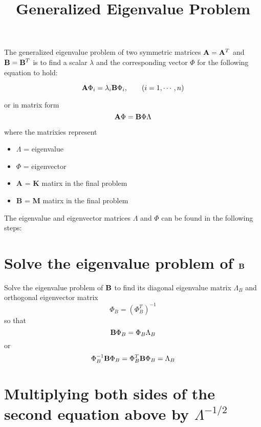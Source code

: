 \documentclass[11pt,letterpaper]{article}
\title{Generalized Eigenvalue Problem}
\date{}
\begin{document}
\maketitle



The generalized eigenvalue problem of two symmetric matrices  ${\bf A}={\bf A}^T$ and ${\bf B}={\bf B}^T$ is to find a scalar $\lambda$ and the corresponding vector $\Phi$ for the following equation to hold: 

\begin{equation}
{\bf A}\Phi_i=\lambda_i{\bf B}\Phi_i, \;\;\;\;\;\;\;(i=1,\cdots,n)
\end{equation}

\noindent or in matrix form 
\begin{equation}
{\bf A}\Phi={\bf B}\Phi\Lambda
\end{equation}

\noindent where the matrixies represent

\begin{itemize}
\item $\Lambda$ = eigenvalue
\item $\Phi$ = eigenvector
\item \textbf{A} = \textbf{K} matirx in the final problem
\item \textbf{B} = \textbf{M} matirx in the final problem
\end{itemize}

 The eigenvalue and eigenvector matrices $\Lambda$ and $\Phi$ can be found in the following steps:

\section{Solve the eigenvalue problem of ${\bf B}$}
Solve the eigenvalue problem of ${\bf B}$ to find its diagonal eigenvalue matrix $\Lambda_B$ and orthogonal eigenvector matrix  
\begin{equation}
\Phi_B=(\Phi_B^T)^{-1}
\end{equation}
\noindent so that 
\begin{equation}
{\bf B}\Phi_B=\Phi_B\Lambda_B
\end{equation}
\noindent or 
\begin{equation}
\Phi_B^{-1}{\bf B}\Phi_B = \Phi_B^{T}{\bf B}\Phi_B = \Lambda_B
\end{equation}


\section{Multiplying both sides of the second equation above by  $\Lambda^{-1/2}$}
\end{document}
